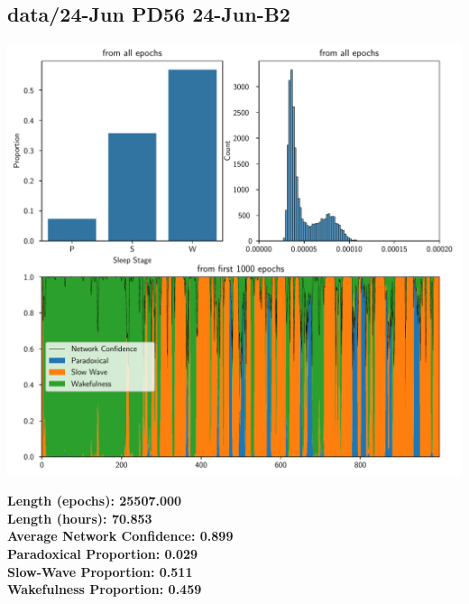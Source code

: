         \subsection*{ data/24-Jun PD56 24-Jun-B2 }
        \begin{center}
        \begin{adjustbox}{width=1\textwidth}
        \includegraphics[page=16]{figs.pdf}
        \end{adjustbox}
        \end{center}
        \large\textbf{Length (epochs): 25507.000}\\
        \textbf{Length (hours): 70.853}\\
        \textbf{Average Network Confidence: 0.899}\\
        \textbf{Paradoxical Proportion: 0.029}\\
        \textbf{Slow-Wave Proportion: 0.511}\\
        \textbf{Wakefulness Proportion: 0.459}\\
        
